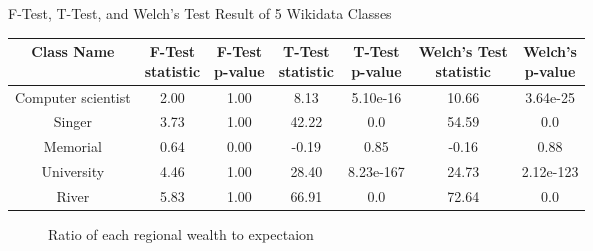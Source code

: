 \begin{center}
\small
\begin{threeparttable}
\caption{F-Test, T-Test, and Welch's Test Result of 5 Wikidata Classes}
\label{tab:western - mean test}
\begin{tabular}{c | c c c c c c} 
\toprule
    Class Name & \CellWithForceBreak{F-Test \\ statistic} & \CellWithForceBreak{F-Test \\ p-value} & \CellWithForceBreak{T-Test \\ statistic} & \CellWithForceBreak{T-Test \\ p-value} & \CellWithForceBreak{Welch's Test \\ statistic} & \CellWithForceBreak{Welch's \\ p-value} \\ [0.5ex] 
\midrule
    Computer scientist & 2.00 & 1.00 & 8.13 & 5.10e-16 & 10.66 & 3.64e-25 \\
    Singer & 3.73 & 1.00 & 42.22 & 0.0 & 54.59 & 0.0 \\
    Memorial & 0.64 & 0.00 & -0.19 & 0.85 & -0.16 & 0.88 \\
    University & 4.46 & 1.00 & 28.40 & 8.23e-167 & 24.73 & 2.12e-123 \\
    River & 5.83 & 1.00 & 66.91 & 0.0 & 72.64 & 0.0 \\
 [1ex]
\bottomrule
\end{tabular}
\begin{tablenotes}
    \footnotesize
    \item{}
\end{tablenotes}
\end{threeparttable}
\end{center}

\begin{figure}
\centering 
{}


\caption{Ratio of each regional wealth to expectaion}\label{fig:western - ratio of regional wealth to expectation}

\end{figure}